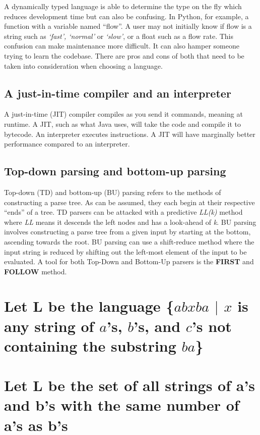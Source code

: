 \documentclass{article}
\begin{document}
A dynamically typed language is able to determine the type on the fly which reduces development time but can also be confusing. In Python, for example, a function with a variable named ``flow''. A user may not initially know if flow is a string such as \textit{`fast', `normal'} or \textit{`slow'}, or a float such as a flow rate. This confusion can make maintenance more difficult. It can also hamper someone trying to learn the codebase. There are pros and cons of both that need to be taken into consideration when choosing a language.

\subsection[JIT Compiler and Interpreters]{A just-in-time compiler and an interpreter}
A just-in-time (JIT) compiler compiles as you send it commands, meaning at runtime. A JIT, such as what Java uses, will take the code and compile it to bytecode. An interpreter executes instructions. A JIT will have marginally better performance compared to an interpreter.

\subsection[Top-Down and Bottom-Up Parsing]{Top-down parsing and bottom-up parsing}
Top-down (TD) and bottom-up (BU) parsing refers to the methods of constructing a parse tree. As can be assumed, they each begin at their respective ``ends'' of a tree. TD parsers can be attacked with a predictive \textit{LL(k)} method where \textit{LL} means it descends the left nodes and has a look-ahead of \textit{k}. BU parsing involves constructing a parse tree from a given input by starting at the bottom, ascending towards the root. BU parsing can use a shift-reduce method where the input string is reduced by shifting out the left-most element of the input to be evaluated. A tool for both Top-Down and Bottom-Up parsers is the \textbf{FIRST} and \textbf{FOLLOW} method.

\newpage
\section[Problem 2]{Let L be the language \{$abxba$ $\vert$ $x$ is any string of $a$'s, $b$'s, and $c$'s not containing the substring $ba$\}}

\newpage
\section[Problem 3]{Let L be the set of all strings of a's and b's with the same number of a's as b's}
\end{document}
